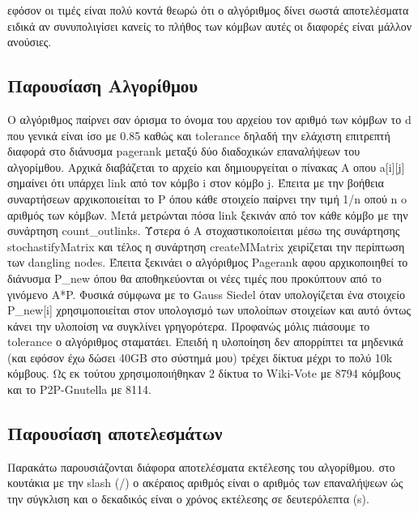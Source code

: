 \documentclass[a4paper,11pt]{article}
\begin{document}
εφόσον οι τιμές είναι πολύ κοντά θεωρώ ότι ο αλγόριθμος δίνει σωστά αποτελέσματα ειδικά αν συνυπολιγίσει κανείς το πλήθος των κόμβων αυτές οι διαφορές είναι μάλλον ανούσιες. 

\subsection{Παρουσίαση Αλγορίθμου} 

Ο αλγόριθμος παίρνει σαν όρισμα το όνομα του αρχείου τον αριθμό των κόμβων το d που γενικά είναι ίσο με 0.85 καθώς και tolerance δηλαδή την ελάχιστη επιτρεπτή διαφορά στο διάνυσμα pagerank μεταξύ δύο διαδοχικών επαναλήψεων του αλγορίμθου.
Αρχικά διαβάζεται το αρχείο και δημιουργείται ο πίνακας Α οπου a[i][j] σημαίνει ότι υπάρχει link από τον κόμβο i στον κόμβο j. Έπειτα με την βοήθεια συναρτήσεων αρχικοποιείται το P όπου κάθε στοιχείο παίρνει την τιμή 1/n οπού n o αριθμός των κόμβων. 
Μετά μετρώνται πόσα link ξεκινάν από τον κάθε κόμβο με την συνάρτηση count\_outlinks. Ύστερα ό Α στοχαστικοποίειται μέσω της συνάρτησης stochastifyΜatrix και τέλος η συνάρτηση createMΜatrix χειρίζεται την περίπτωση των dangling nodes. Έπειτα ξεκινάει ο αλγόριθμος Pagerank αφου αρχικοποιηθεί το διάνυσμα P\_new όπου θα αποθηκεύονται οι νέες τιμές που προκύπτουν από το γινόμενο Α*P. Φυσικά σύμφωνα με το Gauss Siedel όταν υπολογίζεται ένα στοιχείο P\_new[i] χρησιμοποιείται στον υπολογισμό των υπολοίπων στοιχείων και αυτό όντως κάνει την υλοποίση να συγκλίνει γρηγορότερα. Προφανώς μόλις πιάσουμε το tolerance ο αλγόριθμος σταματάει. 
Επειδή η υλοποίηση δεν απορρίπτει τα μηδενικά (και εφόσον έχω δώσει 40GB στο σύστημά μου) τρέχει δίκτυα μέχρι το πολύ 10k κόμβους. Ως εκ τούτου χρησιμοποιήθηκαν 2 δίκτυα το Wiki-Vote με 8794 κόμβους και το  P2P-Gnutella με 8114.


\subsection{Παρουσίαση αποτελεσμάτων}

Παρακάτω παρουσιάζονται διάφορα αποτελέσματα εκτέλεσης του αλγορίθμου. στο κουτάκια με την slash (/) ο ακέραιος αριθμός είναι ο αριθμός των επαναλήψεων ώς την σύγκλιση και ο δεκαδικός είναι ο χρόνος εκτέλεσης σε δευτερόλεπτα (s).
 
\end{document}
